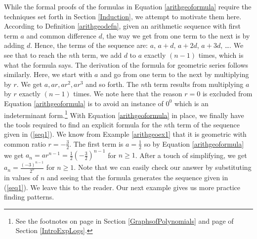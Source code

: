 While the formal proofs of the formulas in Equation \ref{arithgeoformula} require the techniques set forth in Section \ref{Induction}, we attempt to motivate them here.  According to Definition \ref{arithgeodefn}, given an arithmetic sequence with first term $a$ and common difference $d$, the way we get from one term to the next is by adding $d$.  Hence, the terms of the sequence are:  $a$, $a+d$, $a+2d$, $a+3d$, \ldots.  We see that to reach the $n$th term, we add $d$ to $a$ exactly $(n-1)$ times, which is what the formula says.  The derivation of the formula for geometric series follows similarly.  Here, we start with $a$ and go from one term to the next by multiplying by $r$.  We get $a, ar, ar^2, ar^3$ and so forth.  The $n$th term results from multiplying $a$ by $r$ exactly $(n-1)$ times. We note here that the reason $r=0$ is excluded from Equation \ref{arithgeoformula} is to avoid an instance of $0^{0}$ which is an indeterminant form.\footnote{See the footnotes on page \pageref{indeterminantformone} in Section \ref{GraphsofPolynomials} and page \pageref{indeterminantformtwo} of Section \ref{IntroExpLogs}.} With Equation \ref{arithgeoformula} in place, we finally have the tools required to find an explicit formula for the $n$th term of the sequence given in (\ref{seq1}). We know from Example \ref{arithgeoex1} that it is geometric with common ratio $r = -\frac{3}{2}$.  The first term is $a = \frac{1}{2}$ so by Equation \ref{arithgeoformula} we get $a_{n} = ar^{n-1} = \frac{1}{2} \left( - \frac{3}{2}\right)^{n-1}$ for $n \geq 1$.  After a touch of simplifying, we get $a_{n} = \frac{(-3)^{n-1}}{2^{n}}$ for $n \geq 1$. Note that we can easily check our answer by substituting in values of $n$ and seeing that the formula generates the sequence given in (\ref{seq1}).  We leave this to the reader.  Our next example gives us more practice finding patterns.




